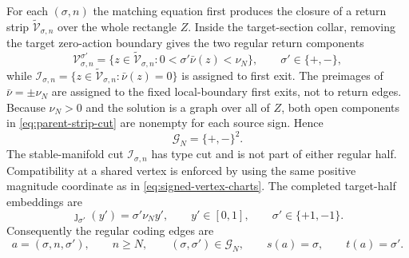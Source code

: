 \documentclass[11pt]{amsart}
\numberwithin{equation}{section}
\theoremstyle{definition}
\theoremstyle{remark}
\begin{document}
For each $(\sigma,n)$ the matching equation first produces the closure of a return strip
$\widetilde{\mathcal V}_{\sigma,n}$ over the whole rectangle $Z$.  Inside
the target-section collar, removing the target zero-action boundary gives
the two regular
return components
\begin{equation}\label{eq:parent-strip-cut}
 \mathcal V_{\sigma,n}^{\sigma'}
 =\{z\in\widetilde{\mathcal V}_{\sigma,n}:
       0<\sigma'\bar\nu(z)<\nu_N\},
 \qquad \sigma'\in\{+,-\},
\end{equation}
while
$\mathcal I_{\sigma,n}
 =\{z\in\widetilde{\mathcal V}_{\sigma,n}:\bar\nu(z)=0\}$
is assigned to first exit.  The preimages of $\bar\nu=\pm\nu_N$ are assigned
to the fixed local-boundary first exits, not to return edges.  Because
$\nu_N>0$ and the solution
is a graph over all of $Z$, both open components in
\eqref{eq:parent-strip-cut} are nonempty for each source sign.  Hence
\begin{equation}\label{eq:full-sign-adjacency}
 \mathcal G_N=\{+,-\}^2.
\end{equation}
The stable-manifold cut $\mathcal I_{\sigma,n}$ has type $\mathrm{cut}$ and is not
part of either regular half.  Compatibility at a shared vertex is enforced
by using the same positive magnitude coordinate as in
\eqref{eq:signed-vertex-charts}.  The completed target-half embeddings are
\begin{equation}\label{eq:half-edge-affine-charts}
 \jmath_{\sigma'}(y')=\sigma'\nu_Ny',
 \qquad y'\in[0,1],\qquad \sigma'\in\{+1,-1\}.
\end{equation}
Consequently the regular coding edges are
\begin{equation}\label{eq:signed-edge-labels}
 a=(\sigma,n,\sigma'),\qquad n\ge N,\qquad
 (\sigma,\sigma')\in\mathcal G_N,\qquad
 s(a)=\sigma,\qquad t(a)=\sigma'.
\end{equation}
\end{document}
